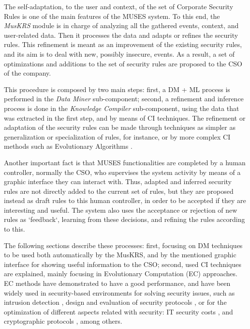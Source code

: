 The self-adaptation, to the user and context, of the set of Corporate Security Rules is one of the main features of the MUSES system.
To this end, the \textit{MusKRS} module is in charge of analyzing all the gathered events, context, and user-related data. Then it processes the data and adapts or refines the security rules. This refinement is meant as an improvement of the existing security rules, and its aim is to deal with new, possibly insecure, events. As a result, a set of optimizations and additions to the set of security rules are proposed to the CSO of the company.

This procedure is composed by two main steps: first, a DM \cite{DataMining_Lee01} + ML \cite{MachineLearning_Bishop06} process is performed in the \textit{Data Miner} sub-component; second, a refinement and inference process is done in the \textit{Knowledge Compiler} sub-component, using the data that was extracted in the first step, and by means of CI techniques.
The refinement or adaptation of the security rules can be made through techniques as simpler as generalization or specialization of rules, for instance, or by more complex CI methods such as Evolutionary Algorithms \cite{EAs_Back96}.

Another important fact is that MUSES functionalities are completed by a human controller, normally the CSO, who supervises the system activity by means of a graphic interface they can interact with.
Thus, adapted and inferred security rules are not directly added to the current set of rules, but they are proposed instead as draft rules to this human controller, in order to be accepted if they are interesting and useful. The system also uses the acceptance or rejection of new rules as `feedback`, learning from these decisions, and refining the rules according to this.

The following sections describe these processes: first, focusing on DM techniques to be used both automatically by the MusKRS, and by the mentioned graphic interface for showing useful information to the CSO; second, used CI techniques are explained, mainly focusing in Evolutionary Computation (EC) \cite{EAs_Back96} approaches. EC methods have demonstrated to have a good performance, and have been widely used in security-based environments for solving security issues, such as intrusion detection \cite{GA_intrusion-majeed}, design and evaluation of security protocols \cite{GP_intrusion-lu,GA_networksecurity-zarza}, or for the optimization of different aspects related with security: IT security costs \cite{EAs_securitycosts-kirta}, and cryptographic protocols \cite{GA_cryptographicprotocols-zarza2}, among others.

